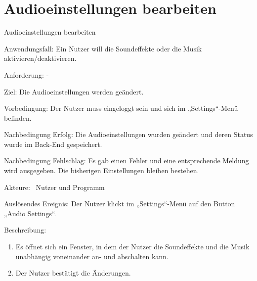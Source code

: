 \section{Audioeinstellungen bearbeiten}
\begin{function}{90}{Audioeinstellungen bearbeiten}
\item[Anwendungsfall:] Ein Nutzer will die  Soundeffekte oder die Musik aktivieren/deaktivieren.
\item[Anforderung:] -
\item[Ziel:] Die Audioeinstellungen werden geändert.
\item[Vorbedingung:] Der Nutzer muss eingeloggt sein und sich im „Settings“-Menü befinden.
\item[Nachbedingung Erfolg:]  Die Audioeinstellungen wurden geändert und deren Status wurde im Back-End gespeichert.
\item[Nachbedingung Fehlschlag:] Es gab einen Fehler und eine entsprechende Meldung wird ausgegeben. Die bisherigen Einstellungen bleiben bestehen.
\item[Akteure:] ~Nutzer und Programm
\item[Auslösendes Ereignis:] Der Nutzer klickt im „Settings“-Menü auf den Button „Audio Settings“.
\item[Beschreibung:] ~
\begin{enumerate}
  \item  Es öffnet sich ein Fenster, in dem der Nutzer die Soundeffekte und die Musik unabhängig voneinander an- und abschalten kann. 
  \item  Der Nutzer bestätigt die Änderungen.
\end{enumerate}
\end{function}

